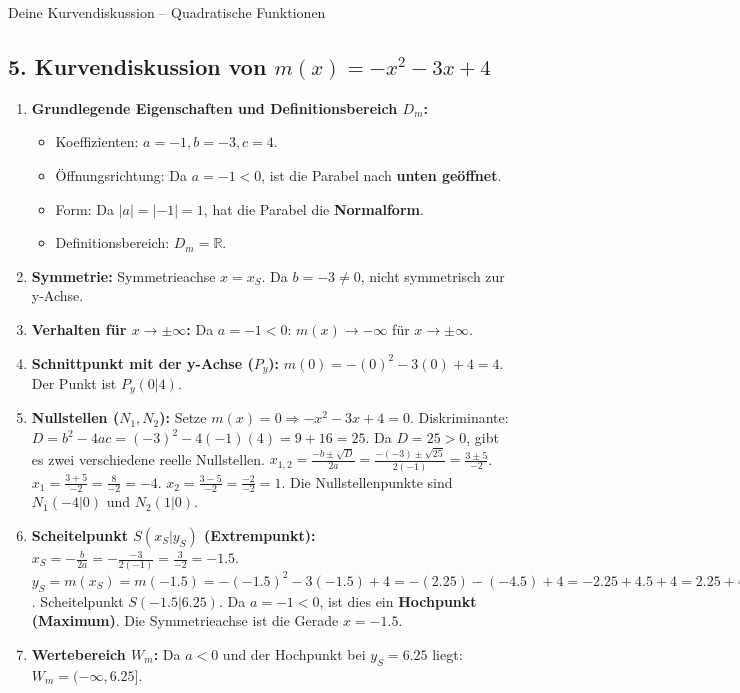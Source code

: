 \begin{loesungsumgebung}{Deine Kurvendiskussion – Quadratische Funktionen}
\subsection*{5. Kurvendiskussion von $m(x) = -x^2 - 3x + 4$}
\begin{enumerate}[label=(\alph*)]
    \item \textbf{Grundlegende Eigenschaften und Definitionsbereich $D_m$:}
    \begin{itemize}
        \item Koeffizienten: $a=-1, b=-3, c=4$.
        \item Öffnungsrichtung: Da $a=-1 < 0$, ist die Parabel nach \textbf{unten geöffnet}.
        \item Form: Da $|a|=|-1|=1$, hat die Parabel die \textbf{Normalform}.
        \item Definitionsbereich: $D_m = \mathbb{R}$.
    \end{itemize}
    \item \textbf{Symmetrie:}
    Symmetrieachse $x = x_S$. Da $b=-3 \neq 0$, nicht symmetrisch zur y-Achse.
    \item \textbf{Verhalten für $x \to \pm \infty$:}
    Da $a=-1 < 0$: $m(x) \to -\infty$ für $x \to \pm \infty$.
    \item \textbf{Schnittpunkt mit der y-Achse ($P_y$):}
    $m(0) = -(0)^2 - 3(0) + 4 = 4$. Der Punkt ist $P_y(0|4)$.
    \item \textbf{Nullstellen ($N_1, N_2$):}
    Setze $m(x)=0 \Rightarrow -x^2 - 3x + 4 = 0$.
    Diskriminante: $D = b^2 - 4ac = (-3)^2 - 4(-1)(4) = 9 + 16 = 25$.
    Da $D=25 > 0$, gibt es zwei verschiedene reelle Nullstellen.
    $x_{1,2} = \frac{-b \pm \sqrt{D}}{2a} = \frac{-(-3) \pm \sqrt{25}}{2(-1)} = \frac{3 \pm 5}{-2}$.
    $x_1 = \frac{3+5}{-2} = \frac{8}{-2} = -4$.
    $x_2 = \frac{3-5}{-2} = \frac{-2}{-2} = 1$.
    Die Nullstellenpunkte sind $N_1(-4|0)$ und $N_2(1|0)$.
    \item \textbf{Scheitelpunkt $S(x_S|y_S)$ (Extrempunkt):}
    $x_S = -\frac{b}{2a} = -\frac{-3}{2(-1)} = \frac{3}{-2} = -1.5$.
    $y_S = m(x_S) = m(-1.5) = -(-1.5)^2 - 3(-1.5) + 4 = -(2.25) - (-4.5) + 4 = -2.25 + 4.5 + 4 = 2.25 + 4 = 6.25$.
    Scheitelpunkt $S(-1.5|6.25)$. Da $a=-1 < 0$, ist dies ein \textbf{Hochpunkt (Maximum)}.
    Die Symmetrieachse ist die Gerade $x=-1.5$.
    \item \textbf{Wertebereich $W_m$:}
    Da $a<0$ und der Hochpunkt bei $y_S=6.25$ liegt: $W_m = (-\infty, 6.25]$.
\end{enumerate}


\end{loesungsumgebung}
